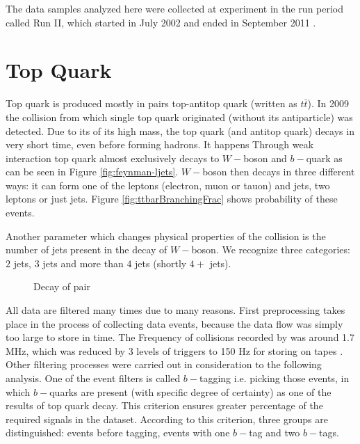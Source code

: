 The data samples analyzed here were collected at \dzero experiment in the run period called Run II, which started in July 2002 and ended in September 2011 \cite{Yuntse}.

\section{Top Quark} \label{sec:topQuark}
Top quark is produced mostly in pairs top-antitop quark (written as $t\bar{t}$). In 2009 the collision from which single top quark originated  (without its antiparticle) was detected. Due to its of its high mass, the top quark (and antitop quark) decays in very short time, even before forming hadrons. It happens Through weak interaction top quark almost exclusively decays to $W-$boson and $b-$quark as can be seen in Figure \ref{fig:feynman-ljets}. $W-$boson then decays in three different ways: it can form one of the leptons (electron, muon or tauon) and jets, two leptons or just jets. Figure \ref{fig:ttbarBranchingFrac} shows probability of these events. 

Another parameter which changes physical properties of the collision is the number of jets present in the decay of $W-$boson. We recognize three categories: $2$ jets, $3$ jets and more than $4$ jets (shortly $4+$ jets).

\begin{figure}[thb]
  \centering
  \caption{Decay of \ttbar pair}
\end{figure} 

All data are filtered many times due to many reasons. First preprocessing takes  place in the process of collecting data events, because the data flow was simply too large to store in time. The Frequency of collisions recorded by \dzero was around 1.7 MHz, which was reduced by 3 levels of triggers to 150 Hz for storing on tapes \cite{Yuntse}. Other filtering processes were carried out in consideration to the following analysis. One of the event filters is called $b-$tagging i.e. picking those events, in which $b-$quarks are present (with specific degree of certainty) as one of the results of top quark decay. This criterion ensures greater percentage of the required signals in the dataset. According to this criterion, three groups are distinguished: events before tagging, events with one $b-$tag and two $b-$tags.

